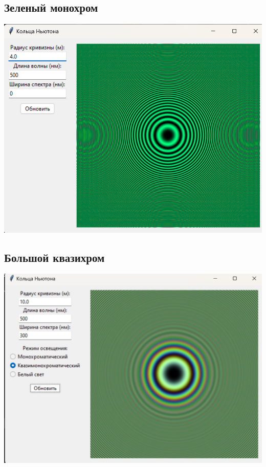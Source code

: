 \documentclass[a4paper,11pt]{article}
\theoremstyle{definition}
\begin{document}
    \subsection{Зеленый монохром}
    \includegraphics[scale=0.7]{3. Newton's rings/demo results/green_mono}

    \subsection{Большой квазихром}
    \includegraphics[scale=0.7]{3. Newton's rings/demo results/big_quasi}
\end{document}

